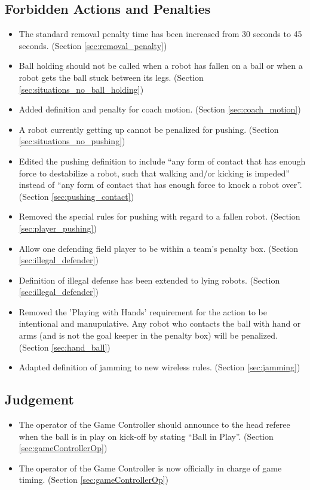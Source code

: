 \documentclass[12pt]{article}
\begin{document}
\subsection*{Forbidden Actions and Penalties}
\begin{itemize}
        \item The standard removal penalty time has been increased from 30 seconds to 45 seconds. (Section \ref{sec:removal_penalty})
	\item Ball holding should not be called when a robot has fallen on a ball or when a robot gets the ball stuck between its legs. (Section \ref{sec:situations_no_ball_holding})
	\item Added definition and penalty for coach motion. (Section \ref{sec:coach_motion})
	\item A robot currently getting up cannot be penalized for pushing. (Section \ref{sec:situations_no_pushing})
	\item Edited the pushing definition to include ``any form of contact that has enough force to destabilize a robot, such that walking and/or kicking is impeded'' instead of ``any form of contact that has enough force to knock a robot over''. (Section \ref{sec:pushing_contact})
	\item Removed the special rules for pushing with regard to a fallen robot. (Section \ref{sec:player_pushing})
	\item Allow one defending field player to be within a team's penalty box. (Section \ref{sec:illegal_defender})
    \item Definition of illegal defense has been extended to lying robots. (Section \ref{sec:illegal_defender})
	\item Removed the 'Playing with Hands' requirement for the action to be intentional and manupulative.  Any robot who contacts the ball with hand or arms (and is not the goal keeper in the penalty box) will be penalized. (Section \ref{sec:hand_ball})
	\item Adapted definition of jamming to new wireless rules. (Section \ref{sec:jamming})
\end{itemize}

\subsection*{Judgement}
\begin{itemize}
	\item The operator of the Game Controller should announce to the head referee when the ball is in play on kick-off by stating ``Ball in Play''. (Section \ref{sec:gameControllerOp})
	\item The operator of the Game Controller is now officially in charge of game timing. (Section \ref{sec:gameControllerOp})
\end{itemize}
\end{document}
